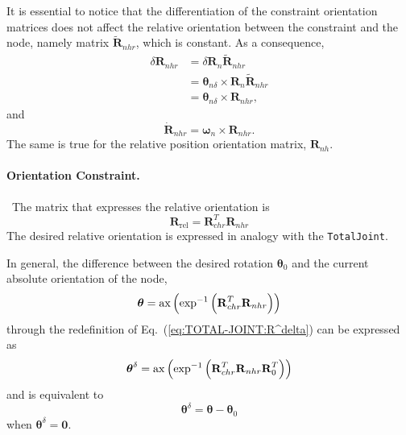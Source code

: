 \documentclass[10pt,dvips,fleqn,subeqn]{report}
\newcommand{\T}[1]{\bm{\mathbf{#1}}}
\begin{document}
It is essential to notice that the differentiation of the constraint
orientation matrices does not affect the relative orientation between
the constraint and the node, namely matrix $\tilde{\T{R}}_{nhr}$,
which is constant.
As a consequence,
\begin{align}
	\delta\T{R}_{nhr}
		&= \delta\T{R}_n \tilde{\T{R}}_{nhr} \nonumber \\
		&= \T{\theta}_{n\delta} \times \T{R}_n \tilde{\T{R}}_{nhr}
		\nonumber \\
		&= \T{\theta}_{n\delta}\times \T{R}_{nhr} ,
\end{align}
and
\begin{equation}
	\dot{\T{R}}_{nhr} = \T{\omega}_n \times \T{R}_{nhr} .
\end{equation}
The same is true for the relative position orientation matrix,
$\T{R}_{nh}$.


\paragraph{Orientation Constraint.} \
The matrix that expresses the relative orientation is
\begin{equation}
	\T{R}_{\mathrm{rel}} = \T{R}_{chr}^T \T{R}_{nhr}
\end{equation}
The desired relative orientation is expressed in analogy 
with the \texttt{TotalJoint}.

In general, the difference between the desired rotation
$\T{\theta}_0$ and the current absolute orientation of the node,
\begin{equation}
	\T{\theta} = \llk{ax}\plbr{\exp^{-1}\plbr{
		\T{R}_{chr}^T \T{R}_{nhr}
	}}
\end{equation}
through the redefinition of Eq.~(\ref{eq:TOTAL-JOINT:R^delta}) 
can be expressed as
\begin{equation}
	\T{\theta}^{\delta} = \llk{ax}\plbr{\exp^{-1}\plbr{
		\T{R}_{chr}^T \T{R}_{nhr} \T{R}_0^T
	}}
	\label{eq:TOTAL-PIN-JOINT:thetadelta}
\end{equation}
and is equivalent to
\begin{equation}
	\T{\theta}^{\delta} = \T{\theta} - \T{\theta}_0
\end{equation}
when $\T{\theta}^{\delta}=\T{0}$.
\end{document}
